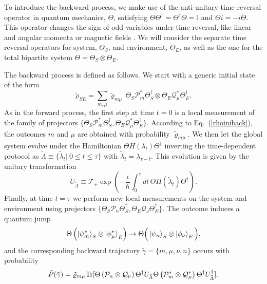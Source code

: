 \documentclass[aps,prx,twocolumn,showpacs,floatfix,superscriptaddress,graphics,longbibliography]{revtex4-1}
\newcommand{\HAT}{}
\begin{document}
To introduce the backward process, we make use of the anti-unitary time-reversal operator in quantum mechanics, $\HAT\Theta$, satisfying $\HAT\Theta \HAT\Theta^\dagger = \HAT\Theta^\dagger \HAT\Theta = \mathbb{I}$ and $\HAT\Theta i = -i \HAT\Theta$. 
This operator changes the sign of odd variables under time reversal, like linear and angular momenta or magnetic fields \cite{CampisiREV,haake}. 
We will consider the separate time reversal operators for system, $\HAT\Theta_S$, and environment, $\HAT\Theta_E$, as well as the one for the total bipartite system $\HAT\Theta = \HAT\Theta_S\otimes \HAT\Theta_E$.

The backward process is defined as follows. 
We start with a generic initial state of the form
\begin{equation}\label{rhoiniback}
 \tilde{\rho}_{SE} =  \sum_{m, \mu} \tilde{\varrho}_{m \mu}\, \HAT\Theta_{S}\HAT{\mathcal{P}}_m^{\ast} \HAT\Theta^\dagger_S\otimes  \HAT\Theta_{E}\HAT{\mathcal{Q}}_\mu^{\ast} \HAT\Theta_{E}^\dagger.
\end{equation}
As in the forward process, the first step at time $t=0$ is a local measurement of the family of projectors $\{\HAT\Theta_S \HAT{\mathcal{P}}_m^\ast \HAT\Theta_S^\dagger , \HAT\Theta_E \HAT{\mathcal{Q}}_\mu^\ast \HAT\Theta_E^\dagger\}$. 
According to Eq.~(\ref{rhoiniback}), the outcomes  $m$ and $\mu$ are obtained with probability $\tilde\varrho_{m\mu}$.
We then let the global system evolve under the Hamiltonian $\Theta H(\lambda_t)\Theta^\dagger$ inverting the time-dependent protocol as $\tilde{\Lambda} \equiv \{\tilde{\lambda}_{t} | ~0 \leq t \leq \tau \}$ with $\tilde{\lambda}_{t} = \lambda_{\tau - t}$. 
This evolution is given by the unitary transformation 
\begin{equation}
\HAT{U}_{\tilde{\Lambda}} \equiv \mathcal{T}_{+} \exp\left( -\frac{i}{\hbar}\int_{0}^{\tau} dt\, \HAT\Theta \HAT{H}(\tilde{\lambda}_{t}) \HAT\Theta^\dagger \right).  
\end{equation}
Finally, at time $t=\tau$ we perform new local measurements on the system and environment using projectors $\{\HAT\Theta_S \HAT{\mathcal{P}}_n \HAT\Theta_S^\dagger , \HAT\Theta_E \HAT{\mathcal{Q}}_\nu \HAT\Theta_E^\dagger \}$. 
The outcome induces a quantum jump
\begin{equation}\label{qjumps_b}
\HAT\Theta \left( \ket{\psi_m^{\ast}}_S \otimes  \ket{\phi_\mu^\ast}_E\right) \rightarrow  \HAT\Theta {\Big (}\ket{\psi_n}_S  \otimes \ket{\phi_\nu}_E {\Big )}, 
\end{equation}
and the corresponding backward trajectory $\tilde{\gamma} = \{m,\mu, \nu, n \}$ occurs with probability
\begin{equation}\label{m_pb}
\tilde{P}({\tilde{\gamma}}) = \tilde{\varrho}_{m \mu} {\rm Tr}[\HAT\Theta \left(\HAT{\mathcal{P}}_n \otimes \HAT{\mathcal{Q}}_\nu\right) \HAT\Theta^\dagger \HAT{U}_{\tilde{\Lambda}} 
\HAT\Theta \left(\HAT{\mathcal{P}}_m^{\ast} \otimes \HAT{\mathcal{Q}}_\mu^\ast\right) \HAT\Theta^\dagger \HAT{U}_{\tilde{\Lambda}}^\dagger]. 
\end{equation} 
\end{document}
